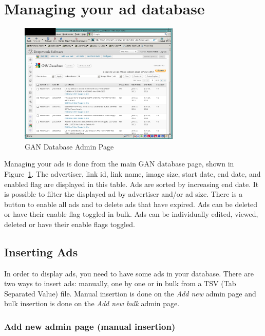 \documentclass[letterpaper]{article}
\begin{document}
\section{Managing your ad database}

\begin{figure}[ht]
\begin{centering}
\includegraphics[width=3in]{gandatabase.png}
\caption{GAN Database Admin Page}
\label{fig:gandb}
\end{centering}
\end{figure}
Managing your ads is done from the main GAN database page, shown in
Figure~\ref{fig:gandb}. The advertiser, link id, link name, image size,
start date, end date, and enabled flag are displayed in this table. Ads
are sorted by increasing end date.  It is possible to filter the
displayed ad by advertiser and/or ad size.  There is a button to enable
all ads and to delete ads that have expired.  Ads can be deleted or
have their enable flag toggled in bulk.  Ads can be individually
edited, viewed, deleted or have their enable flags toggled.

\subsection{Inserting Ads}

In order to display ads, you need to have some ads in your database.
There are two ways to insert ads: manually, one by one or in bulk from
a TSV (Tab Separated Value) file. Manual insertion is done on the
\emph{Add new} admin page and bulk insertion is done on the
\emph{Add new bulk} admin page.

\subsubsection{Add new admin page (manual insertion)}
\end{document}
